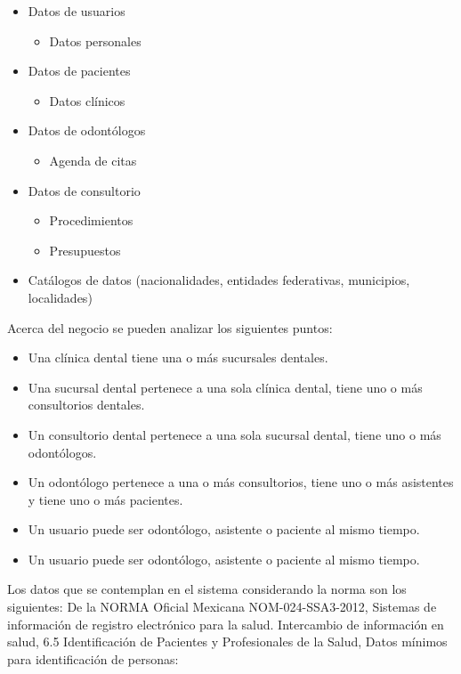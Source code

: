 \begin{itemize}[noitemsep,topsep=0pt]
\item Datos de usuarios 
\begin{itemize}
    \item Datos personales
\end{itemize}
\item Datos de pacientes
\begin{itemize}
    \item Datos clínicos
\end{itemize}
\item Datos de odontólogos
\begin{itemize}
    \item Agenda de citas
\end{itemize}
\item Datos de consultorio
\begin{itemize}
    \item Procedimientos
    \item Presupuestos
\end{itemize}
\item Catálogos de datos (nacionalidades, entidades federativas, municipios, localidades)
\end{itemize}

\bigbreak

Acerca del negocio se pueden analizar los siguientes puntos:

\begin{itemize}
    \item Una clínica dental tiene una o más sucursales dentales.
    \item Una sucursal dental pertenece a una sola clínica dental, tiene uno o más consultorios dentales.
    \item Un consultorio dental pertenece a una sola sucursal dental, tiene uno o más odontólogos.
    \item Un odontólogo pertenece a una o más consultorios, tiene uno o más asistentes y tiene uno o más pacientes.
    \item Un usuario puede ser odontólogo, asistente o paciente al mismo tiempo.
    \item Un usuario puede ser odontólogo, asistente o paciente al mismo tiempo.
\end{itemize}

\bigbreak
\noindent
Los datos que se contemplan en el sistema considerando la norma son los siguientes: 
\bigbreak
De la  NORMA Oficial Mexicana NOM-024-SSA3-2012, Sistemas de información de registro electrónico para la salud. Intercambio de información en salud, 6.5 Identificación de Pacientes y Profesionales de la Salud, Datos mínimos para identificación de personas:

